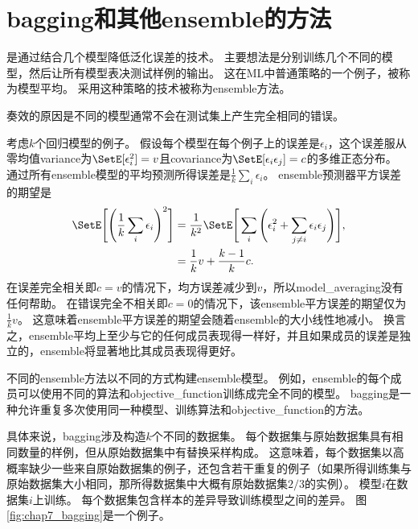\section{\gls{bagging}和其他\gls{ensemble}的方法}
\label{sec:bagging_and_other_ensemble_methods}
是通过结合几个模型降低泛化误差的技术\citep{ML:Breiman:bagging}。
主要想法是分别训练几个不同的模型，然后让所有模型表决测试样例的输出。
这在\gls{ML}中普通策略的一个例子，被称为模型平均。
采用这种策略的技术被称为\gls{ensemble}方法。

奏效的原因是不同的模型通常不会在测试集上产生完全相同的错误。

考虑$k$个回归模型的例子。
假设每个模型在每个例子上的误差是$\epsilon_i$，这个误差服从零均值\gls{variance}为$\SetE[\epsilon_i^2] = v$且\gls{covariance}为$\SetE[\epsilon_i \epsilon_j] = c$的多维正态分布。
通过所有\gls{ensemble}模型的平均预测所得误差是$\frac{1}{k} \sum_i \epsilon_i$。 
\gls{ensemble}预测器平方误差的期望是
\begin{align}
 \SetE \Bigg[\Bigg(\frac{1}{k} \sum_i \epsilon_i \Bigg)^2\Bigg] &= \frac{1}{k^2} 
 \SetE \Bigg[\sum_i \Bigg(\epsilon_i^2 + \sum_{j \neq i} \epsilon_i \epsilon_j\Bigg)\Bigg], \\
&= \frac{1}{k} v + \frac{k-1}{k} c .                             
\end{align}
在误差完全相关即$c=v$的情况下，均方误差减少到$v$，所以\gls{model_averaging}没有任何帮助。
在错误完全不相关即$c =0$的情况下，该\gls{ensemble}平方误差的期望仅为$\frac{1}{k}v$。
这意味着\gls{ensemble}平方误差的期望会随着\gls{ensemble}的大小线性地减小。
换言之，\gls{ensemble}平均上至少与它的任何成员表现得一样好，并且如果成员的误差是独立的，\gls{ensemble}将显著地比其成员表现得更好。

不同的\gls{ensemble}方法以不同的方式构建\gls{ensemble}模型。
例如，\gls{ensemble}的每个成员可以使用不同的算法和\gls{objective_function}训练成完全不同的模型。
\gls{bagging}是一种允许重复多次使用同一种模型、训练算法和\gls{objective_function}的方法。


具体来说，\gls{bagging}涉及构造$k$个不同的数据集。
每个数据集与原始数据集具有相同数量的样例，但从原始数据集中有替换采样构成。
这意味着，每个数据集以高概率缺少一些来自原始数据集的例子，还包含若干重复的例子（如果所得训练集与原始数据集大小相同，那所得数据集中大概有原始数据集$2/3$的实例）。
模型$i$在数据集$i$上训练。
每个数据集包含样本的差异导致训练模型之间的差异。
图\ref{fig:chap7_bagging}是一个例子。

